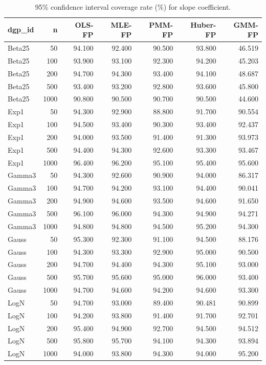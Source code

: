 \begin{table}[t]
\centering
\caption{95\% confidence interval coverage rate (\%) for slope coefficient.}
\label{tab:mc-coverage}
\begin{tabular}{lrrrrrr}
\toprule
dgp_id & n & OLS-FP & MLE-FP & PMM-FP & Huber-FP & GMM-FP \\
\midrule
Beta25 & 50 & 94.100 & 92.400 & 90.500 & 93.800 & 46.519 \\
Beta25 & 100 & 93.900 & 93.100 & 92.300 & 94.200 & 45.203 \\
Beta25 & 200 & 94.700 & 94.300 & 93.400 & 94.100 & 48.687 \\
Beta25 & 500 & 93.400 & 93.200 & 92.800 & 93.600 & 45.800 \\
Beta25 & 1000 & 90.800 & 90.500 & 90.700 & 90.500 & 44.600 \\
Exp1 & 50 & 94.300 & 92.900 & 88.800 & 91.700 & 90.554 \\
Exp1 & 100 & 94.500 & 93.400 & 90.300 & 93.400 & 92.437 \\
Exp1 & 200 & 94.000 & 93.500 & 91.400 & 91.300 & 93.973 \\
Exp1 & 500 & 94.400 & 94.300 & 92.600 & 93.300 & 93.467 \\
Exp1 & 1000 & 96.400 & 96.200 & 95.100 & 95.400 & 95.600 \\
Gamma3 & 50 & 94.300 & 92.600 & 90.900 & 94.000 & 86.317 \\
Gamma3 & 100 & 94.700 & 94.200 & 93.100 & 94.400 & 90.041 \\
Gamma3 & 200 & 94.900 & 94.600 & 93.500 & 94.600 & 91.650 \\
Gamma3 & 500 & 96.100 & 96.000 & 94.300 & 94.900 & 94.271 \\
Gamma3 & 1000 & 94.800 & 94.800 & 94.500 & 95.200 & 94.300 \\
Gauss & 50 & 95.300 & 92.300 & 91.100 & 94.500 & 88.176 \\
Gauss & 100 & 94.300 & 93.300 & 92.900 & 95.000 & 90.500 \\
Gauss & 200 & 94.700 & 94.400 & 94.300 & 95.100 & 93.000 \\
Gauss & 500 & 95.700 & 95.600 & 95.000 & 96.000 & 93.400 \\
Gauss & 1000 & 94.700 & 94.600 & 94.200 & 94.600 & 93.300 \\
LogN & 50 & 94.700 & 93.000 & 89.400 & 90.481 & 90.899 \\
LogN & 100 & 94.200 & 93.800 & 91.400 & 91.700 & 92.701 \\
LogN & 200 & 95.400 & 94.900 & 92.700 & 94.500 & 94.512 \\
LogN & 500 & 95.800 & 95.700 & 94.100 & 94.300 & 93.894 \\
LogN & 1000 & 94.000 & 93.800 & 94.300 & 94.000 & 95.200 \\
\bottomrule
\end{tabular}
\end{table}
